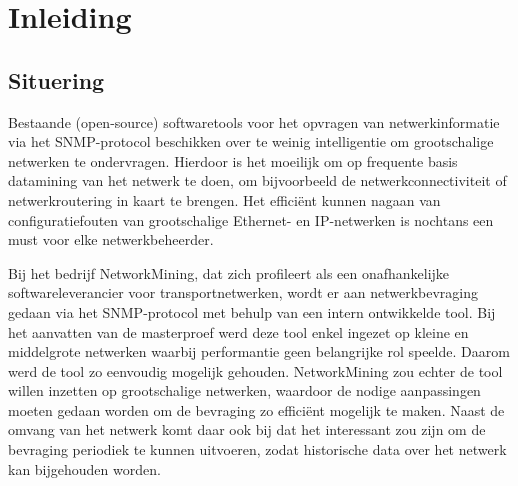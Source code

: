 

\chapter{Inleiding}


\section{Situering}
Bestaande (open-source) softwaretools voor het opvragen van netwerkinformatie via het SNMP-protocol beschikken over te weinig intelligentie om
grootschalige netwerken te ondervragen.
Hierdoor is het moeilijk om op frequente basis datamining van het netwerk te doen, om bijvoorbeeld de netwerkconnectiviteit of netwerkroutering in kaart te brengen.
Het efficiënt kunnen nagaan van configuratiefouten van grootschalige Ethernet- en IP-netwerken is nochtans een must voor elke netwerkbeheerder.

Bij het bedrijf NetworkMining, dat zich profileert als een onafhankelijke softwareleverancier voor transportnetwerken,
wordt er aan netwerkbevraging gedaan via het SNMP-protocol met behulp van een intern ontwikkelde tool.
Bij het aanvatten van de masterproef werd deze tool enkel ingezet op kleine en middelgrote netwerken waarbij performantie geen belangrijke rol speelde.
Daarom werd de tool zo eenvoudig mogelijk gehouden.
NetworkMining zou echter de tool willen inzetten op grootschalige netwerken,
waardoor de nodige aanpassingen moeten gedaan worden om de bevraging zo efficiënt mogelijk te maken.
Naast de omvang van het netwerk komt daar ook bij dat het interessant zou zijn om
de bevraging periodiek te kunnen uitvoeren, zodat historische data over het netwerk kan bijgehouden worden.


